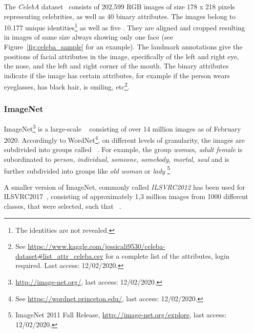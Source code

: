 The \textit{CelebA} dataset~\citep{liu2015faceattributes} consists of 202,599 RGB images of size 178 x 218 pixels representing celebrities, as well as 40 binary attributes.
The images belong to 10.177 unique identities\footnote{The identities are not revealed.} as well as five .
They are aligned and cropped resulting in images of same size always showing only one face (see Figure~\ref{fig:celeba_sample} for an example).
The landmark annotations give the positions of facial attributes in the image, specifically of the left and right eye, the nose, and the left and right corner of the mouth.
The binary attributes indicate if the image has certain attributes, for example if the person wears eyeglasses, has black hair, is smiling, etc\footnote{See \href{https://www.kaggle.com/jessicali9530/celeba-dataset\#list\_attr\_celeba.csv}{https://www.kaggle.com/jessicali9530/celeba-dataset\#list\_attr\_celeba.csv} for a complete list of the attributes, login required. Last access: 12/02/2020.}.

\subsubsection{ImageNet}\label{ssec:imagenet}

ImageNet\footnote{\href{http://image-net.org/}{http://image-net.org/}, last access: 12/02/2020.} is a large-scale ~\citep{imagenet_cvpr09} consisting of over 14 million images as of February 2020.
Accordingly to WordNet\footnote{See \href{https://wordnet.princeton.edu/}{https://wordnet.princeton.edu/}, last access: 12/02/2020.}, on different levels of granularity, the images are subdivided into groups called ~\citep{imagenet_cvpr09}.
For example, the group \textit{woman, adult female} is subordinated to \textit{person, individual, someone, somebody, mortal, soul} and is further subdivided into groups like \textit{old woman} or \textit{lady} \footnote{ImageNet 2011 Fall Release, \href{http://image-net.org/explore}{http://image-net.org/explore}, last access: 12/02/2020.}

A smaller version of ImageNet, commonly called \textit{ILSVRC2012} has been used for \ac{ILSVRC2017}~\citep{ILSVRC15}, consisting of approximately 1,3 million images from 1000 different classes, that were selected, such that ~\citep{imagenet_cvpr09}.

